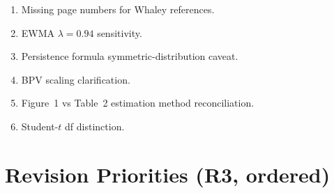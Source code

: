 \documentclass[12pt,a4paper]{article}
\begin{document}
\begin{enumerate}[label=m\arabic*]
\item Missing page numbers for Whaley references.
\item EWMA $\lambda = 0.94$ sensitivity.
\item Persistence formula symmetric-distribution caveat.
\item BPV scaling clarification.
\item Figure~1 vs Table~2 estimation method reconciliation.
\item Student-$t$ df distinction.
\end{enumerate}


\section*{Revision Priorities (R3, ordered)}
\end{document}
